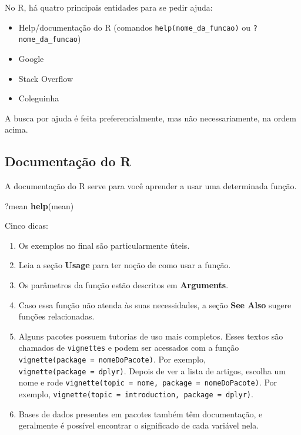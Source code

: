 \documentclass[
]{book}
\newenvironment{Shaded}{\begin{snugshade}}{\end{snugshade}}
\newcommand{\KeywordTok}[1]{\textcolor[rgb]{0.13,0.29,0.53}{\textbf{#1}}}
\newcommand{\NormalTok}[1]{#1}
\providecommand{\tightlist}{%
  \setlength{\itemsep}{0pt}\setlength{\parskip}{0pt}}
\begin{document}
No R, há quatro principais entidades para se pedir ajuda:

\begin{itemize}
\tightlist
\item
  Help/documentação do R (comandos \texttt{help(nome\_da\_funcao)} ou \texttt{?nome\_da\_funcao})
\item
  Google
\item
  Stack Overflow
\item
  Coleguinha
\end{itemize}

A busca por ajuda é feita preferencialmente, mas não necessariamente, na ordem acima.

\hypertarget{documentauxe7uxe3o-do-r}{%
\subsection{Documentação do R}\label{documentauxe7uxe3o-do-r}}

A documentação do R serve para você aprender a usar uma determinada função.

\begin{Shaded}
\begin{Highlighting}[]
\NormalTok{?mean}
\KeywordTok{help}\NormalTok{(mean)}
\end{Highlighting}
\end{Shaded}

Cinco dicas:

\begin{enumerate}
\def\labelenumi{\arabic{enumi}.}
\tightlist
\item
  Os exemplos no final são particularmente úteis.
\item
  Leia a seção \textbf{Usage} para ter noção de como usar a função.
\item
  Os parâmetros da função estão descritos em \textbf{Arguments}.
\item
  Caso essa função não atenda às suas necessidades, a seção \textbf{See Also} sugere funções relacionadas.
\item
  Alguns pacotes possuem tutorias de uso mais completos. Esses textos são chamados de \texttt{vignettes} e podem ser acessados com a função \texttt{vignette(package\ =\ \textquotesingle{}nomeDoPacote\textquotesingle{})}. Por exemplo, \texttt{vignette(package\ =\ \textquotesingle{}dplyr\textquotesingle{})}. Depois de ver a lista de artigos, escolha um nome e rode \texttt{vignette(topic\ =\ \textquotesingle{}nome\textquotesingle{},\ package\ =\ \textquotesingle{}nomeDoPacote\textquotesingle{})}. Por exemplo, \texttt{vignette(topic\ =\ \textquotesingle{}introduction\textquotesingle{},\ package\ =\ \textquotesingle{}dplyr\textquotesingle{})}.
\item
  Bases de dados presentes em pacotes também têm documentação, e geralmente é possível encontrar o significado de cada variável nela.
\end{enumerate}
\end{document}
